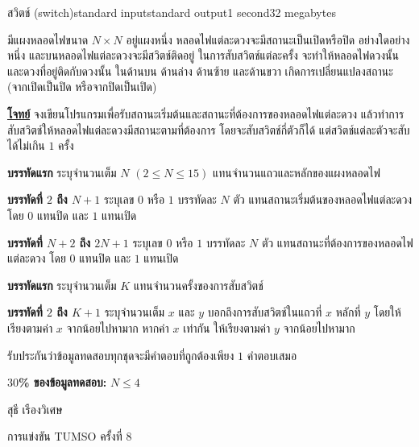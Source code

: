 \documentclass[11pt,a4paper]{article}
\begin{document}
\begin{problem}{สวิตช์ (switch)}{standard input}{standard output}{1 second}{32 megabytes}

มีแผงหลอดไฟขนาด $N \times N$ อยู่แผงหนึ่ง หลอดไฟแต่ละดวงจะมีสถานะเป็นเปิดหรือปิด อย่างใดอย่างหนึ่ง และบนหลอดไฟแต่ละดวงจะมีสวิตช์ติดอยู่ ในการสับสวิตช์แต่ละครั้ง จะทำให้หลอดไฟดวงนั้น และดวงที่อยู่ติดกับดวงนั้น ในด้านบน ด้านล่าง ด้านซ้าย และด้านขวา เกิดการเปลี่ยนแปลงสถานะ (จากเปิดเป็นปิด หรือจากปิดเป็นเปิด)

\bigskip
\underline{\textbf{โจทย์}}  จงเขียนโปรแกรมเพื่อรับสถานะเริ่มต้นและสถานะที่ต้องการของหลอดไฟแต่ละดวง แล้วทำการสับสวิตช์ให้หลอดไฟแต่ละดวงมีสถานะตามที่ต้องการ โดยจะสับสวิตช์กี่ตัวก็ได้ แต่สวิตช์แต่ละตัวจะสับได้ไม่เกิน $1$ ครั้ง


\InputFile

\textbf{บรรทัดแรก} ระบุจำนวนเต็ม $N$ $(2 \leq N \leq 15)$ แทนจำนวนแถวและหลักของแผงหลอดไฟ

\textbf{บรรทัดที่ $2$ ถึง $N+1$} ระบุเลข $0$ หรือ $1$ บรรทัดละ $N$ ตัว แทนสถานะเริ่มต้นของหลอดไฟแต่ละดวง โดย $0$ แทนปิด และ $1$ แทนเปิด

\textbf{บรรทัดที่ $N+2$ ถึง $2N+1$} ระบุเลข $0$ หรือ $1$ บรรทัดละ $N$ ตัว แทนสถานะที่ต้องการของหลอดไฟแต่ละดวง โดย $0$ แทนปิด และ $1$ แทนเปิด


\OutputFile

\textbf{บรรทัดแรก} ระบุจำนวนเต็ม $K$ แทนจำนวนครั้งของการสับสวิตช์

\textbf{บรรทัดที่ $2$ ถึง $K+1$} ระบุจำนวนเต็ม $x$ และ $y$ บอกถึงการสับสวิตช์ในแถวที่ $x$ หลักที่ $y$ โดยให้เรียงตามค่า $x$ จากน้อยไปหามาก หากค่า $x$ เท่ากัน ให้เรียงตามค่า $y$ จากน้อยไปหามาก

รับประกันว่าข้อมูลทดสอบทุกชุดจะมีคำตอบที่ถูกต้องเพียง $1$ คำตอบเสมอ

\Examples

\begin{example}
%
%
\end{example}

\Scoring 

\textbf{$30$\% ของข้อมูลทดสอบ:} $N \leq 4$

\Source

สุธี เรืองวิเศษ

การแข่งขัน TUMSO ครั้งที่ 8

\end{problem}
\end{document}
